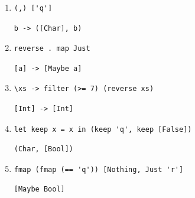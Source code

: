 \documentclass[11pt]{article}
\begin{document}
\begin{enumerate}
\item
\begin{minipage}[t]{\linewidth}
\vspace{-\baselineskip}
\begin{lstlisting}
(,) ['q']
\end{lstlisting}
\begin{lstlisting}[style=answer]
b -> ([Char], b)
\end{lstlisting}
\end{minipage}

\item
\begin{minipage}[t]{\linewidth}
\vspace{-\baselineskip}
\begin{lstlisting}
reverse . map Just
\end{lstlisting}
\begin{lstlisting}[style=answer]
[a] -> [Maybe a]
\end{lstlisting}
\end{minipage}

\item
\begin{minipage}[t]{\linewidth}
\vspace{-\baselineskip}
\begin{lstlisting}
\xs -> filter (>= 7) (reverse xs)
\end{lstlisting}
\begin{lstlisting}[style=answer]
[Int] -> [Int]
\end{lstlisting}
\end{minipage}

\item
\begin{minipage}[t]{\linewidth}
\vspace{-\baselineskip}
\begin{lstlisting}
let keep x = x in (keep 'q', keep [False])
\end{lstlisting}
\begin{lstlisting}[style=answer]
(Char, [Bool])
\end{lstlisting}
\end{minipage}

\item
\begin{minipage}[t]{\linewidth}
\vspace{-\baselineskip}
\begin{lstlisting}
fmap (fmap (== 'q')) [Nothing, Just 'r']
\end{lstlisting}
\begin{lstlisting}[style=answer]
[Maybe Bool]
\end{lstlisting}
\end{minipage}

\end{enumerate}
\end{document}
